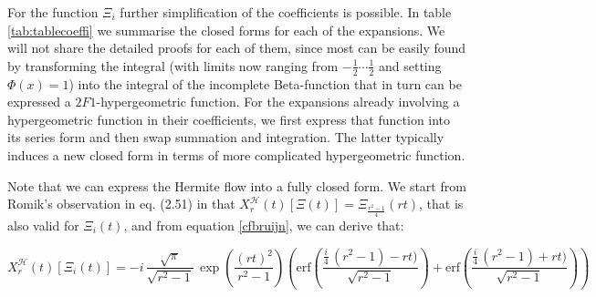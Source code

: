 \documentclass[a4paper,11pt,twoside]{amsart}
\newcommand\erf{\mathrm{erf}}
\begin{document}
\pagebreak
For the function $\Xi_i$ further simplification of the coefficients is possible. In table \ref{tab:tablecoeffi} we summarise the closed forms for each of the expansions. We will not share the detailed proofs for each of them, since most can be easily found by transforming the integral (with limits now ranging from $-\frac12\cdots\frac12$ and setting $\Phi(x)=1$) into the integral of the incomplete Beta-function that in turn can be expressed a $2F1$-hypergeometric function. For the expansions already involving a hypergeometric function in their coefficients, we first express that function into its series form and then swap summation and integration. The latter typically induces a new closed form in terms of more complicated hypergeometric function.

Note that we can express the Hermite flow into a fully closed form. We start from Romik's observation in eq. (2.51) in \cite{rom} that $\displaystyle X^{\mathcal{H}}_r(t)\left[\Xi(t)\right] = \Xi_{\frac{r^2-1}{4}}(rt)$, that is also valid for $\Xi_i(t)$, and from equation \ref{cfbruijn}, we can derive that:

\begin{equation}
X^{\mathcal{H}}_r(t)\left[\Xi_i(t)\right] = -i\,\frac{\sqrt{\pi}}{\sqrt{r^2-1}}\,\exp\left(\frac{(rt)^2}{r^2-1}\right)\left(\erf\left(\frac{\frac{i}{4}\,(r^2-1)-rt)}{\sqrt{r^2-1}}\right)+\erf\left(\frac{\frac{i}{4}\,(r^2-1)+rt)}{\sqrt{r^2-1}}\right)\right) \label{Hermitecf}
\end{equation}
\end{document}
